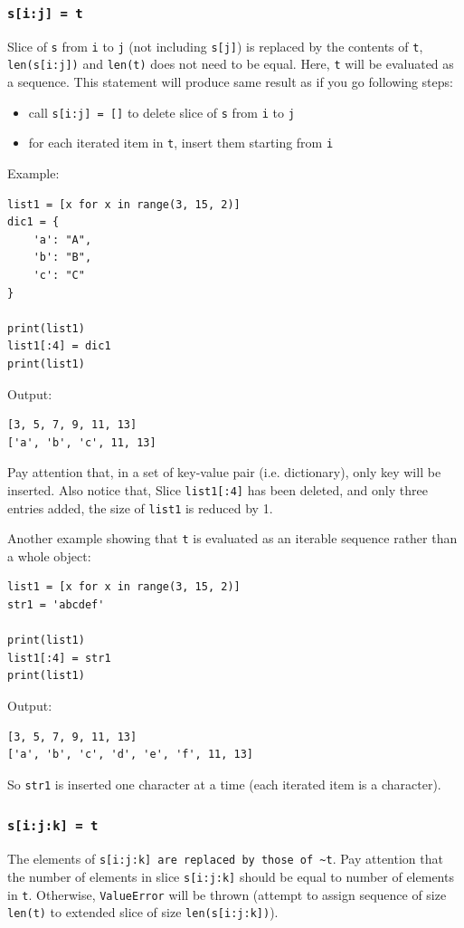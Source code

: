 \documentclass[12pt]{book}
\begin{document}
\subsubsection{\texttt{s[i:j] = t}}
\label{sec:orgd1d3120}
Slice of \texttt{s} from \texttt{i} to \texttt{j} (not including \texttt{s[j]}) is replaced by the contents of \texttt{t}, \texttt{len(s[i:j])} and \texttt{len(t)} does not need to be equal. Here, \texttt{t} will be evaluated as a sequence. This statement will produce same result as if you go following steps:
\begin{itemize}
\item call \texttt{s[i:j] = []} to delete slice of \texttt{s} from \texttt{i} to \texttt{j}
\item for each iterated item in \texttt{t}, insert them starting from \texttt{i}
\end{itemize}

Example:
\begin{verbatim}
list1 = [x for x in range(3, 15, 2)]
dic1 = {
    'a': "A",
    'b': "B",
    'c': "C"
}

print(list1)
list1[:4] = dic1
print(list1)
\end{verbatim}
Output:
\begin{verbatim}
[3, 5, 7, 9, 11, 13]
['a', 'b', 'c', 11, 13]
\end{verbatim}
Pay attention that, in a set of key-value pair (i.e. dictionary), only key will be inserted. Also notice that, Slice \texttt{list1[:4]} has been deleted, and only three entries added, the size of \texttt{list1} is reduced by 1.

Another example showing that \texttt{t} is evaluated as an iterable sequence rather than a whole object:
\begin{verbatim}
list1 = [x for x in range(3, 15, 2)]
str1 = 'abcdef'

print(list1)
list1[:4] = str1
print(list1)
\end{verbatim}
Output:
\begin{verbatim}
[3, 5, 7, 9, 11, 13]
['a', 'b', 'c', 'd', 'e', 'f', 11, 13]
\end{verbatim}
So \texttt{str1} is inserted one character at a time (each iterated item is a character).

\subsubsection{\texttt{s[i:j:k] = t}}
\label{sec:org46d4ccc}
The elements of \texttt{s[i:j:k] are replaced by those of \textasciitilde{}t}. Pay attention that the number of elements in slice \texttt{s[i:j:k]} should be equal to number of elements in \texttt{t}. Otherwise, \texttt{ValueError} will be thrown (attempt to assign sequence of size \texttt{len(t)} to extended slice of size \texttt{len(s[i:j:k])}).
\end{document}
